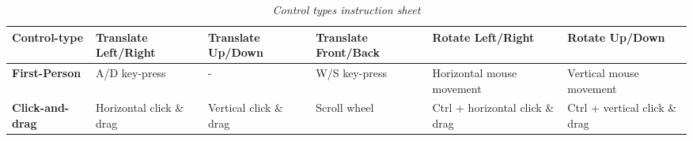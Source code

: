 \begin{table}[h]	
  \centering
	    \begin{tabular}{|p{2.5cm}|p{2.25cm}|p{2.25cm}|p{2.25cm}|p{2.25cm}|p{2.25cm}|}
  	    \hline	
  	    \textbf{Control-type} & \textbf{Translate Left/Right} & \textbf{Translate Up/Down} & \textbf{Translate Front/Back} & \textbf{Rotate Left/Right} & \textbf{Rotate Up/Down} \\
		\hline
		\textbf{First-Person} & A/D key-press & - & W/S key-press & Horizontal mouse movement & Vertical mouse movement \\
		\hline
		\textbf{Click-and-drag} & Horizontal click \& drag & Vertical click \& drag & Scroll wheel & Ctrl + horizontal click \& drag & Ctrl + vertical click \& drag\\
		\hline
		\end{tabular}
		\caption{\textit{Control types instruction sheet}}
		\label{tab:control_types}
\end{table}

